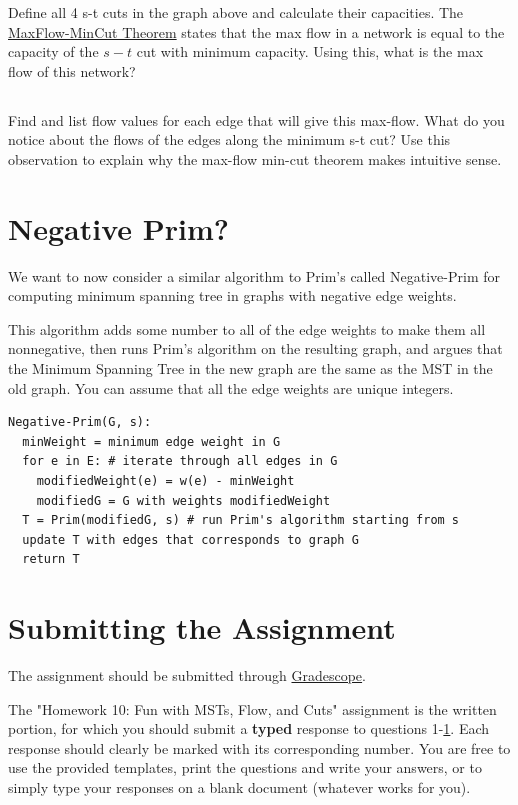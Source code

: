 \documentclass [12pt]{article}
\begin{document}
Define all 4 s-t cuts in the graph above and calculate their capacities. The \href{https://en.wikipedia.org/wiki/Max-flow_min-cut_theorem}{MaxFlow-MinCut Theorem} states that the max flow in a network is equal to the capacity of the $s-t$ cut with minimum capacity. Using this, what is the max flow of this network?



\subsection{}

Find and list flow values for each edge that will give this max-flow. What do you notice about the flows of the edges along the minimum s-t cut? Use this observation to explain why the max-flow min-cut theorem makes intuitive sense.



\pagebreak
\section{Negative Prim? }
\label{sec:last}
We want to now consider a similar algorithm to Prim's called Negative-Prim for computing minimum spanning tree in graphs with negative edge weights.

This algorithm adds some number to all of the edge weights to make them all nonnegative, then runs Prim's algorithm on the resulting graph, and argues that the Minimum Spanning Tree in the new graph are the same as the MST in the old graph. You can assume that all the edge weights are unique integers.

\begin{verbatim}
Negative-Prim(G, s):
  minWeight = minimum edge weight in G
  for e in E: # iterate through all edges in G
    modifiedWeight(e) = w(e) - minWeight
    modifiedG = G with weights modifiedWeight
  T = Prim(modifiedG, s) # run Prim's algorithm starting from s
  update T with edges that corresponds to graph G
  return T
\end{verbatim}



\section*{Submitting the Assignment}

The assignment should be submitted through \href{https://www.gradescope.com/courses/350304}{Gradescope}.

The "Homework 10: Fun with MSTs, Flow, and Cuts" assignment is the written portion, for which you should submit a \textbf{typed} response to questions 1-\ref{sec:last}. Each response should clearly be marked with its corresponding number. You are free to use the provided templates, print the questions and write your answers, or to simply type your responses on a blank document (whatever works for you).
\end{document}
